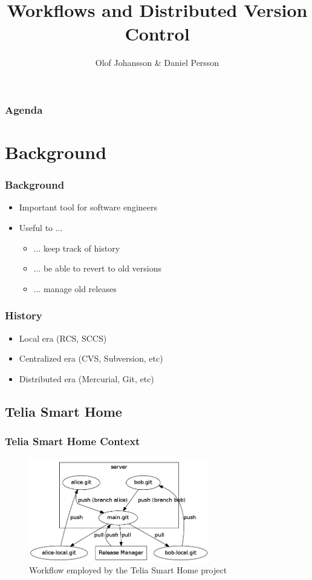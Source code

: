 \documentclass{beamer}
\title{Workflows and Distributed Version Control}
\author{Olof Johansson \& Daniel Persson}
\begin{document}
\begin{frame}
 \maketitle
\end{frame}

\begin{frame}
 \transwipe
 \frametitle{Agenda}
 \tableofcontents
\end{frame}

\section{Background}
\begin{frame}
 \transwipe
 \frametitle{Background}
 \begin{itemize}
  \item Important tool for software engineers
  \item Useful to ...
  \begin{itemize}
   \item ... keep track of history
   \item ... be able to revert to old versions
   \item ... manage old releases
  \end{itemize}
 \end{itemize}
\end{frame}

\begin{frame}
 \transwipe
 \frametitle{History}
 \begin{itemize}
  \item Local era (RCS, SCCS)
  \item Centralized era (CVS, Subversion, etc)
  \item Distributed era (Mercurial, Git, etc)
 \end{itemize}
\end{frame}

\subsection{Telia Smart Home}
\begin{frame}
 \transdissolve
 \frametitle{Telia Smart Home Context}
 \begin{figure}
  \centering
   \includegraphics[width=0.7\textwidth]{../workflow} 
  \caption{Workflow employed by the Telia Smart Home project}
 \end{figure}
\end{frame}
\end{document}
